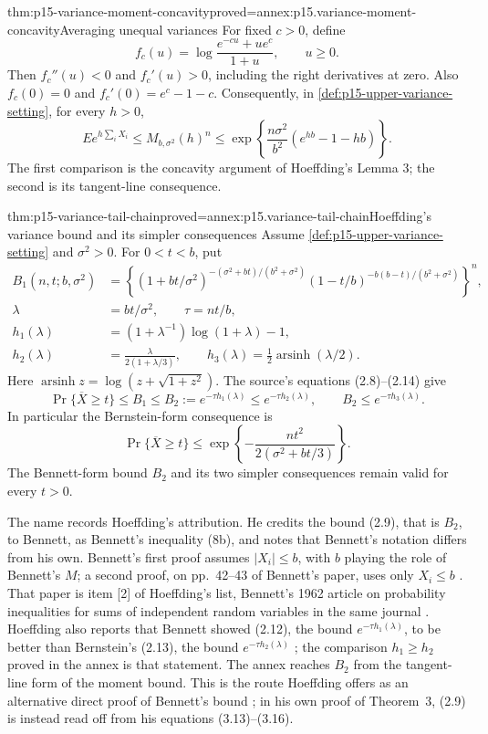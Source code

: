 \begin{hblemma}{thm:p15-variance-moment-concavity}{proved=annex:p15.variance-moment-concavity}{Averaging unequal variances}
For fixed \(c>0\), define
\[
 f_c(u)=\log\frac{e^{-cu}+ue^c}{1+u},\qquad u\geq0.
\]
Then \(f_c''(u)<0\) and \(f_c'(u)>0\), including the right derivatives
at zero. Also \(f_c(0)=0\) and \(f_c'(0)=e^c-1-c\).
Consequently, in \cref{def:p15-upper-variance-setting}, for every \(h>0\),
\[
 E e^{h\sum_iX_i}
 \leq M_{b,\sigma^2}(h)^n
 \leq \exp\!\left\{\frac{n\sigma^2}{b^2}(e^{hb}-1-hb)\right\}.
\]
The first comparison is the concavity argument of Hoeffding's Lemma 3;
the second is its tangent-line consequence.
\end{hblemma}

\begin{hbtheorem}{thm:p15-variance-tail-chain}{proved=annex:p15.variance-tail-chain}{Hoeffding's variance bound and its simpler consequences}
Assume \cref{def:p15-upper-variance-setting} and \(\sigma^2>0\).
For \(0<t<b\), put
\[
\begin{split}
 B_1(n,t;b,\sigma^2)
 &=
 \left\{
 (1+bt/\sigma^2)^{-(\sigma^2+bt)/(b^2+\sigma^2)}
 (1-t/b)^{-b(b-t)/(b^2+\sigma^2)}
 \right\}^{n},\\
 \lambda&=bt/\sigma^2,\qquad \tau=nt/b,\\
 h_1(\lambda)&=(1+\lambda^{-1})\log(1+\lambda)-1,\\
 h_2(\lambda)&=\frac{\lambda}{2(1+\lambda/3)},\qquad
 h_3(\lambda)=\frac12\operatorname{arsinh}(\lambda/2).
\end{split}
\]
Here \(\operatorname{arsinh}z=\log(z+\sqrt{1+z^2})\).
The source's equations (2.8)--(2.14) give
\[
 \Pr\{\overline X\geq t\}\leq B_1
 \leq B_2:=e^{-\tau h_1(\lambda)}
 \leq e^{-\tau h_2(\lambda)},\qquad
 B_2\leq e^{-\tau h_3(\lambda)}.
\]
In particular the Bernstein-form consequence is
\[
 \Pr\{\overline X\geq t\}
 \leq \exp\!\left\{-\frac{nt^2}{2(\sigma^2+bt/3)}\right\}.
\]
The Bennett-form bound \(B_2\) and its two simpler consequences remain
valid for every \(t>0\).

The name records Hoeffding's attribution. He credits the bound (2.9),
that is \(B_2\), to Bennett, as Bennett's inequality (8b), and notes that
Bennett's notation differs from his own. Bennett's first proof assumes
\(|X_i|\leq b\), with \(b\) playing the role of Bennett's \(M\); a second
proof, on pp.~42--43 of Bennett's paper, uses only \(X_i\leq b\)
\cite[p.~16]{Hoeffding1963BoundedSums}. That paper is item [2] of
Hoeffding's list, Bennett's 1962 article on probability inequalities for
sums of independent random variables in the same journal
\cite[p.~29]{Hoeffding1963BoundedSums}. Hoeffding also reports that
Bennett showed (2.12), the bound \(e^{-\tau h_1(\lambda)}\), to be better
than Bernstein's (2.13), the bound \(e^{-\tau h_2(\lambda)}\)
\cite[p.~17]{Hoeffding1963BoundedSums}; the comparison
\(h_1\geq h_2\) proved in the annex is that statement. The annex reaches
\(B_2\) from the tangent-line form of the moment bound. This is the
route Hoeffding offers as an alternative direct proof of Bennett's bound
\cite[p.~24]{Hoeffding1963BoundedSums}; in his own proof of Theorem~3,
(2.9) is instead read off from his equations (3.13)--(3.16).


\end{hbtheorem}
